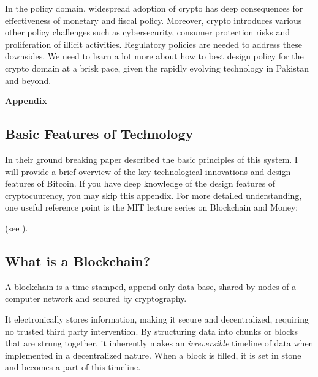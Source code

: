 \documentclass[12pt]{article}
\newcommand{\1}{\mathbbm 1}
\begin{document}
		In the policy domain, widespread adoption of crypto has deep consequences for effectiveness of monetary and fiscal policy. Moreover, crypto introduces various other policy challenges such as cybersecurity, consumer protection risks and proliferation of illicit activities. Regulatory policies are needed to address these downsides. We need to learn a lot more about how to best design policy for the crypto domain at a brisk pace, given the rapidly evolving technology in Pakistan and beyond. 
		
		
		
		
		
		
		\newpage
		
		\begin{center}
		\textbf{Appendix}
	     \end{center}
		
		
		\begin{center}
			\section{\textbf{Basic Features of Technology}}
		\end{center}
		
		In their ground breaking paper \cite{nakamoto2008bitcoin} described the basic principles of this system. I will provide a brief overview of the key technological innovations and design features of Bitcoin. If you have deep knowledge of the design features of cryptocuurency, you may skip this appendix. For more detailed understanding, one useful reference point is the MIT lecture series on Blockchain and Money: 
		
		(see {\color{blue}{https://www.youtube.com/watch?v=EH6vE97qIP4}}).
		
		\subsection{\textbf{What is a Blockchain?}}
		
		A blockchain is a time stamped, append only data base, shared by nodes of a computer network and secured by cryptography. 
		
		It electronically stores information, making it secure and decentralized, requiring no trusted third party intervention. By structuring data into chunks or blocks that are strung together, it inherently makes an \textit{irreversible} timeline of data when implemented in a decentralized nature. When a block is filled, it is set in stone and becomes a part of this timeline. 
		
\end{document}
